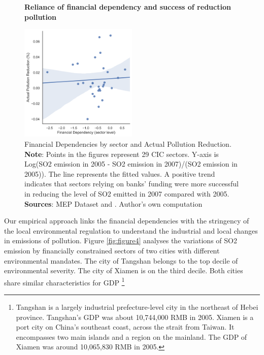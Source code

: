 \documentclass[12pt]{article}
\begin{document}
\begin{figure}[ht]
    \centering
    \textbf{Reliance of financial dependency and success of reduction pollution}\par\medskip
    \includegraphics[width=0.5\textwidth]{fig_3}
    \caption{Financial Dependencies by sector and Actual Pollution Reduction. \textbf{Note}: Points in the figures represent 29 CIC sectors. Y-axis is Log(SO2 emission in 2005 - SO2 emission in 2007)/(SO2 emission in 2005)). The line represents the fitted values. A positive trend indicates that sectors relying on banks’ funding were more successful in reducing the level of SO2 emitted in 2007 compared with 2005. \\
    \textbf{Sources}: MEP Dataset and \cite{Fan2015-bm}. Author's own computation}
    \label{fig:figure3}
\end{figure}

Our empirical approach links the financial dependencies with the stringency of the local environmental regulation to understand the industrial and local changes in emissions of pollution. Figure \ref{fig:figure4} analyses the variations of SO2 emission by financially constrained sectors of two cities with different environmental mandates. The city of Tangshan belongs to the top decile of environmental severity. The city of Xiamen is on the third decile. Both cities share similar characteristics for GDP \footnote{Tangshan is a largely industrial prefecture-level city in the northeast of Hebei province. Tangshan’s GDP was about 10,744,000 RMB in 2005. Xiamen is a port city on China’s southeast coast, across the strait from Taiwan. It encompasses two main islands and a region on the mainland. The GDP of Xiamen was around 10,065,830 RMB in 2005.}
\end{document}
